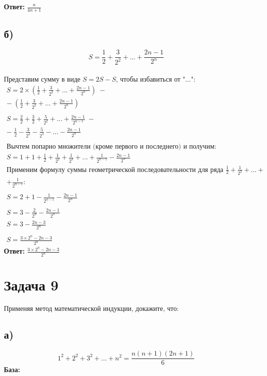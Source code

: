 \documentclass[a4p aper,12pt]{article}
\begin{document}
{\textbf{Ответ:} $ \frac{n}{4n+1}$
\subsection*{б)}
\[S =  \frac{1}{2} + \frac{3}{2^2} + \ldots + \frac{2n-1}{2^n}\]\\

Представим сумму в виде $ S = 2S - S$, чтобы избавиться от "$\ldots$":
\begin{equation*}
\begin{gathered}
S =  2\times(\frac{1}{2} + \frac{3}{2^2} + \ldots + \frac{2n-1}{2^n})\; -  \\
-\; (\frac{1}{2} + \frac{3}{2^2} + \ldots + \frac{2n-1}{2^n})\\\\
S = \frac{2}{2} + \frac{3}{2} + \frac{5}{2^2} + \ldots   + \frac{2n-1}{2^{n-1}} \;- \\
-\;\frac{1}{2} - \frac{3}{2^2} - \frac{5}{2^3} - \ldots - \frac{2n-1}{2^n}\\\\
\text{Вычтем попарно множители (кроме первого и последнего) и получим:}\\
S = 1 + 1 + \frac{1}{2} + \frac{1}{2^2} + \frac{1}{2^3} + \ldots + \frac{1}{2^{n-1}} - \frac{2n-1}{2^n}\\
\text{Применим формулу суммы геометрической последовательности для ряда } \frac{1}{2} + \frac{1}{2^2} + \ldots + \\ +\frac{1}{2^{n-1}}:\\\\
S = 2 + 1 - \frac{1}{2^{n-1}} - \frac{2n-1}{2^n}\\\\
S = 3 - \frac{2}{2^n} - \frac{2n-1}{2^n}\\
S = 3 - \frac{2n-3}{2^n}\\\\
S = \frac{3\times2^n -2n -3}{2^n}
\end{gathered}
\end{equation*}
{\large \textbf{Ответ:} $\frac{3\times2^n -2n -3}{2^n}$}

\section{Задача 9}
Применяя метод математической индукции, докажите, что:
\subsection*{а)}
\[ 1^2+2^2+ 3^2 + \ldots + n^2 = \frac{n(n+1)(2n+1)}{6}
\]
\textbf{База:}

}
\end{document}
